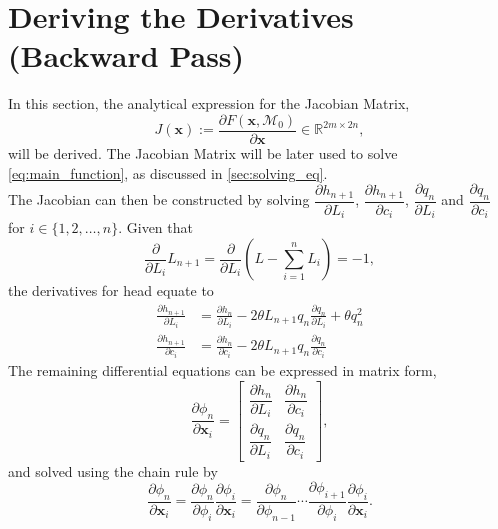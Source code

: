 \section{Deriving the Derivatives (Backward Pass)}

In this section, the analytical expression for the Jacobian Matrix,
\begin{equation*}
    J(\mathbf{x}):=\frac{\partial F(\mathbf{x},\mathcal{M}_0)}{\partial \mathbf{x}} \in \mathbb{R}^{2m\times 2n},
\end{equation*}
will be derived. The Jacobian Matrix will be later used to solve \cref{eq:main_function}, as discussed in \autoref{sec:solving_eq}.\\

The Jacobian can then be constructed by solving 
$\dfrac{\partial h_{n+1}}{\partial L_i}$, 
$\dfrac{\partial h_{n+1}}{\partial c_i}$,
$\dfrac{\partial q_n}{\partial L_i}$ and
$\dfrac{\partial q_n}{\partial c_i}$
for $i\in \{1,2,\dots,n\}$.
Given that
\begin{equation*}
    \frac{\partial}{\partial L_i} L_{n+1} = \frac{\partial}{\partial L_i} \left(L-\sum_{i=1}^n L_i\right) = -1,
\end{equation*}
the derivatives for head equate to
\begin{align}
    \frac{\partial h_{n+1}}{\partial L_i} &= \frac{\partial h_n}{\partial L_i} 
    - 2 \theta L_{n+1} q_n \frac{\partial q_{n}}{\partial L_i} 
    + \theta q_n^2 \\
    \frac{\partial h_{n+1}}{\partial c_i} &= \frac{\partial h_n}{\partial c_i}
     - 2 \theta L_{n+1} q_n \frac{\partial q_{n}}{\partial c_i}
\end{align}
The remaining differential equations can be expressed in matrix form,
\begin{equation*}
\frac{\partial \phi_{n}}{\partial \mathbf{x}_i} = 
    \begin{bmatrix}
        \dfrac{\partial h_n}{\partial L_i} & \dfrac{\partial h_n}{\partial c_i} \\
        \dfrac{\partial q_n}{\partial L_i} & \dfrac{\partial q_n}{\partial c_i}
    \end{bmatrix},
\end{equation*}
and solved using the chain rule by
\begin{equation*}
    \frac{\partial \phi_{n}}{\partial \mathbf{x}_i} = 
    \frac{\partial \phi_{n}}{\partial \phi_{i}} \frac{\partial \phi_i}{\partial \mathbf{x}_i} =
    \frac{\partial \phi_{n}}{\partial \phi_{n-1}} \cdots
    \frac{\partial \phi_{i+1}}{\partial \phi_{i}}
    \frac{\partial \phi_{i}}{\partial \mathbf{x}_i}.
\end{equation*}
